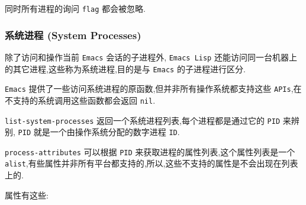 \documentclass[11pt]{article}
\begin{document}
同时所有进程的询问 \texttt{flag} 都会被忽略.


\subsubsection{系统进程 (System Processes)}
\label{sec:org99f6bea}

除了访问和操作当前 \texttt{Emacs} 会话的子进程外, \texttt{Emacs Lisp} 还能访问同一台机器上的其它进程,这些称为系统进程,目的是与 \texttt{Emacs} 的子进程进行区分.

\texttt{Emacs} 提供了一些访问系统进程的原函数,但并非所有操作系统都支持这些 \texttt{APIs},在不支持的系统调用这些函数都会返回 \texttt{nil}.

\texttt{list-system-processes} 返回一个系统进程列表,每个进程都是通过它的 \texttt{PID} 来辨别, \texttt{PID} 就是一个由操作系统分配的数字进程 \texttt{ID}.

\texttt{process-attributes} 可以根据 \texttt{PID} 来获取进程的属性列表,这个属性列表是一个 \texttt{alist},有些属性并非所有平台都支持的,所以,这些不支持的属性是不会出现在列表上的.

属性有这些:
\end{document}
